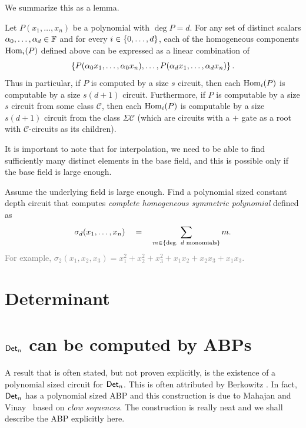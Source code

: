 We summarize this as a lemma. 

\begin{lemma}\label{lem:computing-hom-components}
Let $P(x_1,\ldots, x_n)$ be a polynomial with $\deg P = d$. For any set of distinct scalars $\alpha_0, \ldots, \alpha_{d} \in \mathbb{F}$ and for every $i \in \left\{0,\ldots, d\right\}$,  each of the homogeneous components $\operatorname{Hom}_i(P)$ defined above can be expressed as a linear combination of 
\[
\left\{P(\alpha_0x_1,\ldots, \alpha_0x_n), \ldots, P(\alpha_dx_1,\ldots, \alpha_dx_n)\right\}.
\]
Thus in particular, if $P$ is computed by a size $s$ circuit, then each $\operatorname{Hom}_i(P)$ is computable  by a size $s(d+1)$ circuit. Furthermore, if $P$ is computable by a size $s$ circuit from some class $\mathcal{C}$, then each $\operatorname{Hom}_i(P)$ is computable by a size $s(d+1)$ circuit from the class $\Sigma \mathcal{C}$ (which are circuits with a $+$ gate as a root with $\mathcal{C}$-circuits as its children).
\end{lemma}

It is important to note that for interpolation, we need to be able to find sufficiently many distinct elements in the base field, and this is possible only if the base field is large enough. 

\begin{exercise}
Assume the underlying field is large enough. Find a polynomial sized constant depth circuit that computes \emph{complete homogeneous symmetric polynomial} defined as
\[
\sigma_d(x_1,\ldots, x_n) \quad = \quad \sum_{m \in \left\{\text{deg. $d$ monomials}\right\}} m.
\]
\textcolor{gray}{For example, $\sigma_2(x_1,x_2,x_3) = x_1^2 + x_2^2 + x_3^2 + x_1x_2 + x_2x_3 + x_1x_3$.}
\end{exercise}


\section{Determinant}


\section{$\operatorname{\mathsf{Det}}_n$ can be computed by ABPs}

A result that is often stated, but not proven explicitly, is the existence of a polynomial sized circuit for $\operatorname{\mathsf{Det}}_n$. 
This is often attributed by Berkowitz \cite{Berk84}. 
In fact, $\operatorname{\mathsf{Det}}_n$ has a polynomial sized ABP and this construction is due to Mahajan and Vinay~\cite{mv97} based on \emph{clow sequences}. 
The construction is really neat and we shall describe the ABP explicitly here. 

